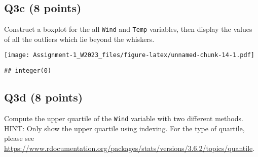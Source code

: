 \documentclass[
]{article}
\newenvironment{Shaded}{\begin{snugshade}}{\end{snugshade}}
\newcommand{\AttributeTok}[1]{\textcolor[rgb]{0.13,0.29,0.53}{#1}}
\newcommand{\CommentTok}[1]{\textcolor[rgb]{0.56,0.35,0.01}{\textit{#1}}}
\newcommand{\ConstantTok}[1]{\textcolor[rgb]{0.56,0.35,0.01}{#1}}
\newcommand{\FloatTok}[1]{\textcolor[rgb]{0.00,0.00,0.81}{#1}}
\newcommand{\FunctionTok}[1]{\textcolor[rgb]{0.13,0.29,0.53}{\textbf{#1}}}
\newcommand{\NormalTok}[1]{#1}
\newcommand{\OtherTok}[1]{\textcolor[rgb]{0.56,0.35,0.01}{#1}}
\newcommand{\SpecialCharTok}[1]{\textcolor[rgb]{0.81,0.36,0.00}{\textbf{#1}}}
\newcommand{\StringTok}[1]{\textcolor[rgb]{0.31,0.60,0.02}{#1}}
\begin{document}
\hypertarget{q3c-8-points}{%
\subsection{Q3c (8 points)}\label{q3c-8-points}}

Construct a boxplot for the all \texttt{Wind} and \texttt{Temp}
variables, then display the values of all the outliers which lie beyond
the whiskers.

\begin{Shaded}
\end{Shaded}

\texttt{[image: Assignment-1\_W2023\_files/figure-latex/unnamed-chunk-14-1.pdf]}

\begin{verbatim}
## integer(0)
\end{verbatim}

\hypertarget{q3d-8-points}{%
\subsection{Q3d (8 points)}\label{q3d-8-points}}

Compute the upper quartile of the \texttt{Wind} variable with two
different methods. HINT: Only show the upper quartile using indexing.
For the type of quartile, please see
\url{https://www.rdocumentation.org/packages/stats/versions/3.6.2/topics/quantile}.

\begin{Shaded}
\end{Shaded}
\end{document}
